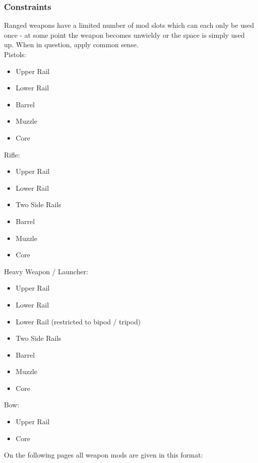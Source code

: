 \subsubsection{Constraints}
Ranged weapons have a limited number of mod slots which can each only be used once - at some point the weapon becomes unwieldy or the space is simply used up. When in question, apply common sense.\\
Pistols:
\vspace{-10mm}
\begin{itemize}
	\setlength\itemsep{-8mm}
	\item Upper Rail
	\item Lower Rail
	\item Barrel
	\item Muzzle
	\item Core
\end{itemize}
Rifle:
\vspace{-10mm}
\begin{itemize}
	\setlength\itemsep{-8mm}
	\item Upper Rail
	\item Lower Rail
	\item Two Side Rails
	\item Barrel
	\item Muzzle
	\item Core
\end{itemize}
Heavy Weapon / Launcher:
\vspace{-10mm}
\begin{itemize}
	\setlength\itemsep{-8mm}
	\item Upper Rail
	\item Lower Rail
	\item Lower Rail (restricted to bipod / tripod)
	\item Two Side Rails
	\item Barrel
	\item Muzzle
	\item Core
\end{itemize}
Bow:
\vspace{-10mm}
\begin{itemize}
	\setlength\itemsep{-8mm}
	\item Upper Rail
	\item Core
\end{itemize}
On the following pages all weapon mods are given in this format:\par
\vspace{-5mm}
\begin{exampleblock}
\end{exampleblock}

